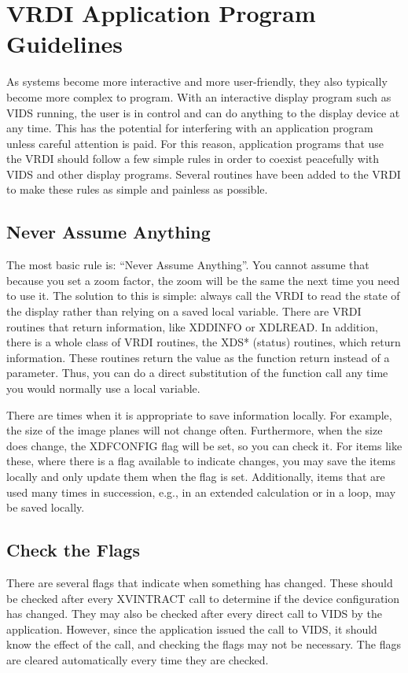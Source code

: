 \section{VRDI Application Program Guidelines}
\label{guidelines}
As systems become more interactive and more user-friendly, they also
typically become more complex to program.  With an interactive display
program such as VIDS running, the user is in control and can do anything
to the display device at any time.  This has the potential for interfering
with an application program unless careful attention is paid.  For
this reason, application programs that use the VRDI should follow a few
simple rules in order to coexist peacefully with VIDS and other display
programs.  Several routines have been added to the VRDI to make these
rules as simple and painless as possible.
\subsection{Never Assume Anything}
The most basic rule is:  ``Never Assume Anything''.  You cannot assume that
because you set a zoom factor, the zoom will be the same the next time
you need to use it.  The solution to this is simple:  always call the
VRDI to read the state of the display rather than relying on a saved
local variable.  There are VRDI routines that return
information, like XDDINFO or XDLREAD.  In addition, there is a whole
class of VRDI routines, the XDS* (status) routines, which return
information.  These routines return the value as the function return
instead of a parameter.  Thus, you can do a direct substitution of the
function call any time you would normally use a local variable.

There are times when it is appropriate to save information locally.
For example, the size of the image planes will not change often.  Furthermore,
when the size does change, the XDFCONFIG flag will be set, so you can check it.
For items like these, where there is a flag available to indicate changes,
you may save the items locally and only update them when
the flag is set.  Additionally, items that are used many times in
succession, e.g., in an extended calculation or in a loop, may be saved
locally.
\subsection{Check the Flags}
There are several flags that indicate when something has changed.  These
should be checked after every XVINTRACT call to determine if the device
configuration has changed.  They may also be checked after every direct
call to VIDS by the application.  However, since the application issued
the call to VIDS, it should know the effect of the call, and checking
the flags may not be necessary.  The flags are cleared automatically
every time they are checked.

